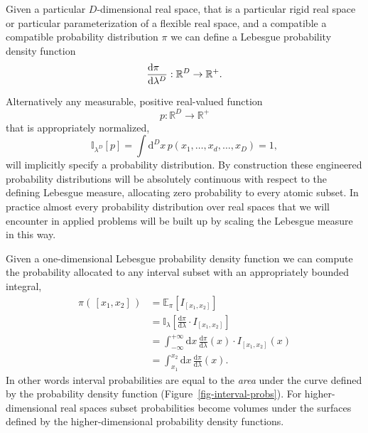 \documentclass[
  letterpaper,
  DIV=11,
  numbers=noendperiod]{scrartcl}
\begin{document}
Given a particular \(D\)-dimensional real space, that is a particular
rigid real space or particular parameterization of a flexible real
space, and a compatible a compatible probability distribution \(\pi\) we
can define a Lebesgue probability density function \[
\frac{ \mathrm{d} \pi \hphantom{ {}^{D} } }{ \mathrm{d} \lambda^{D} } :
\mathbb{R}^{D} \rightarrow \mathbb{R}^{+}.
\]

Alternatively any measurable, positive real-valued function \[
p : \mathbb{R}^{D} \rightarrow \mathbb{R}^{+}
\] that is appropriately normalized, \[
\mathbb{I}_{\lambda^{D}}[ p ]
= \int \mathrm{d}^{D} x \, p(x_{1}, \ldots, x_{d}, \ldots, x_{D})
= 1,
\] will implicitly specify a probability distribution. By construction
these engineered probability distributions will be absolutely continuous
with respect to the defining Lebesgue measure, allocating zero
probability to every atomic subset. In practice almost every probability
distribution over real spaces that we will encounter in applied problems
will be built up by scaling the Lebesgue measure in this way.

Given a one-dimensional Lebesgue probability density function we can
compute the probability allocated to any interval subset with an
appropriately bounded integral, \begin{align*}
\pi( \, [ x_{1}, x_{2} ] \, )
&=
\mathbb{E}_{\pi} \left[ I_{[ x_{1}, x_{2} ]} \right]
\\
&=
\mathbb{I}_{\lambda} \left[
\frac{ \mathrm{d} \pi }{ \mathrm{d} \lambda} \cdot I_{[ x_{1}, x_{2} ]}
\right]
\\
&=
\int_{-\infty}^{+\infty} \mathrm{d} x \,
\frac{ \mathrm{d} \pi }{ \mathrm{d} \lambda}(x) \cdot I_{[ x_{1}, x_{2} ]}(x)
\\
&=
\int_{x_{1}}^{x_{2}} \mathrm{d} x \,
\frac{ \mathrm{d} \pi }{ \mathrm{d} \lambda}(x).
\end{align*} In other words interval probabilities are equal to the
\emph{area} under the curve defined by the probability density function
(Figure~\ref{fig-interval-probs}). For higher-dimensional real spaces
subset probabilities become volumes under the surfaces defined by the
higher-dimensional probability density functions.
\end{document}
